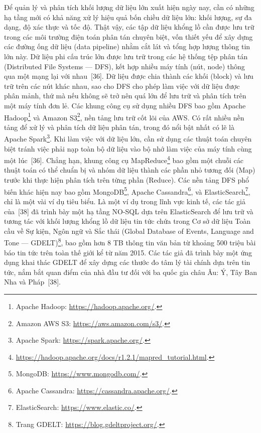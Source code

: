 Để quản lý và phân tích khối lượng dữ liệu lớn xuất hiện ngày nay, cần có những hạ tầng mới có khả năng xử lý hiệu quả bốn chiều dữ liệu lớn: khối lượng, sự đa dạng, độ xác thực và tốc độ. Thật vậy, các tập dữ liệu khổng lồ cần được lưu trữ trong các môi trường điện toán phân tán chuyên biệt, vốn thiết yếu để xây dựng các đường ống dữ liệu (data pipeline) nhằm cắt lát và tổng hợp lượng thông tin lớn này. Dữ liệu phi cấu trúc lớn được lưu trữ trong các hệ thống tệp phân tán (Distributed File Systems — DFS), kết hợp nhiều máy tính (nút, node) thông qua một mạng lại với nhau~[36]. Dữ liệu được chia thành các khối (block) và lưu trữ trên các nút khác nhau, sao cho DFS cho phép làm việc với dữ liệu được phân mảnh, thứ mà nếu không sẽ trở nên quá lớn để lưu trữ và phân tích trên một máy tính đơn lẻ. Các khung công cụ sử dụng nhiều DFS bao gồm Apache Hadoop\footnote{Apache Hadoop: \url{https://hadoop.apache.org/}.} và Amazon S3\footnote{Amazon AWS S3: \url{https://aws.amazon.com/s3/}.}, nền tảng lưu trữ cốt lõi của AWS. Có rất nhiều nền tảng để xử lý và phân tích dữ liệu phân tán, trong đó nổi bật nhất có lẽ là Apache Spark\footnote{Apache Spark: \url{https://spark.apache.org/}.}. Khi làm việc với dữ liệu lớn, cần sử dụng các thuật toán chuyên biệt tránh việc phải nạp toàn bộ dữ liệu vào bộ nhớ làm việc của máy tính cùng một lúc~[36]. Chẳng hạn, khung công cụ MapReduce\footnote{\url{https://hadoop.apache.org/docs/r1.2.1/mapred_tutorial.html}.} bao gồm một chuỗi các thuật toán có thể chuẩn bị và nhóm dữ liệu thành các phần nhỏ tương đối (Map) trước khi thực hiện phân tích trên từng phần (Reduce). Các nền tảng DFS phổ biến khác hiện nay bao gồm MongoDB\footnote{MongoDB: \url{https://www.mongodb.com/}.}, Apache Cassandra\footnote{Apache Cassandra: \url{https://cassandra.apache.org/}.}, và ElasticSearch\footnote{ElasticSearch: \url{https://www.elastic.co/}.}, chỉ là một vài ví dụ tiêu biểu. Là một ví dụ trong lĩnh vực kinh tế, các tác giả của~[38] đã trình bày một hạ tầng NO-SQL dựa trên ElasticSearch để lưu trữ và tương tác với khối lượng khổng lồ dữ liệu tin tức chứa trong Cơ sở dữ liệu Toàn cầu về Sự kiện, Ngôn ngữ và Sắc thái (Global Database of Events, Language and Tone — GDELT)\footnote{Trang GDELT: \url{https://blog.gdeltproject.org/}.}, bao gồm hơn 8 TB thông tin văn bản từ khoảng 500 triệu bài báo tin tức trên toàn thế giới kể từ năm 2015. Các tác giả đã trình bày một ứng dụng khai thác GDELT để xây dựng các thước đo tâm lý tài chính dựa trên tin tức, nắm bắt quan điểm của nhà đầu tư đối với ba quốc gia châu Âu: Ý, Tây Ban Nha và Pháp~[38].

